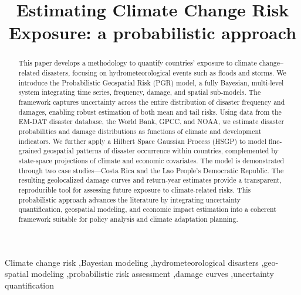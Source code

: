 \documentclass[preprint,12pt,authoryear]{elsarticle}
\begin{document}
\begin{frontmatter}

\title{Estimating Climate Change Risk Exposure: a probabilistic approach}

\begin{abstract}
This paper develops a methodology to quantify countries' exposure to climate change--related disasters, focusing on hydrometeorological events such as floods and storms. We introduce the Probabilistic Geospatial Risk (PGR) model, a fully Bayesian, multi-level system integrating time series, frequency, damage, and spatial sub-models. The framework captures uncertainty across the entire distribution of disaster frequency and damages, enabling robust estimation of both mean and tail risks. Using data from the EM-DAT disaster database, the World Bank, GPCC, and NOAA, we estimate disaster probabilities and damage distributions as functions of climate and development indicators. We further apply a Hilbert Space Gaussian Process (HSGP) to model fine-grained geospatial patterns of disaster occurrence within countries, complemented by state-space projections of climate and economic covariates. The model is demonstrated through two case studies---Costa Rica and the Lao People's Democratic Republic. The resulting geolocalized damage curves and return-year estimates provide a transparent, reproducible tool for assessing future exposure to climate-related risks. This probabilistic approach advances the literature by integrating uncertainty quantification, geospatial modeling, and economic impact estimation into a coherent framework suitable for policy analysis and climate adaptation planning.
\end{abstract}

\begin{keyword}
Climate change risk \sep Bayesian modeling \sep hydrometeorological disasters \sep geo-spatial modeling \sep probabilistic risk assessment \sep damage curves \sep uncertainty quantification
\end{keyword}

\end{frontmatter}

\newpage






\clearpage

\newpage

\newpage
\end{document}
